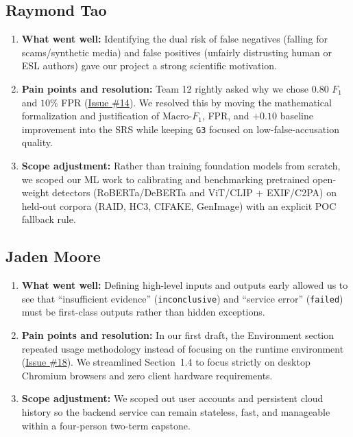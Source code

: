 \documentclass[11pt]{article}
\begin{document}
\subsection*{Raymond Tao}
\begin{enumerate}[leftmargin=*]
    \item \textbf{What went well:} Identifying the dual risk of false negatives (falling for scams/synthetic media) and false positives (unfairly distrusting human or ESL authors) gave our project a strong scientific motivation.
    \item \textbf{Pain points and resolution:} Team 12 rightly asked why we chose $0.80$ $F_1$ and $10\%$ FPR (\href{https://github.com/richy1337/Verity/issues/14}{Issue \#14}). We resolved this by moving the mathematical formalization and justification of $\text{Macro-}F_1$, FPR, and $+0.10$ baseline improvement into the SRS while keeping \texttt{G3} focused on low-false-accusation quality.
    \item \textbf{Scope adjustment:} Rather than training foundation models from scratch, we scoped our ML work to calibrating and benchmarking pretrained open-weight detectors (RoBERTa/DeBERTa and ViT/CLIP + EXIF/C2PA) on held-out corpora (RAID, HC3, CIFAKE, GenImage) with an explicit POC fallback rule.
\end{enumerate}

\subsection*{Jaden Moore}
\begin{enumerate}[leftmargin=*]
    \item \textbf{What went well:} Defining high-level inputs and outputs early allowed us to see that ``insufficient evidence'' (\texttt{inconclusive}) and ``service error'' (\texttt{failed}) must be first-class outputs rather than hidden exceptions.
    \item \textbf{Pain points and resolution:} In our first draft, the Environment section repeated usage methodology instead of focusing on the runtime environment (\href{https://github.com/richy1337/Verity/issues/18}{Issue \#18}). We streamlined Section~1.4 to focus strictly on desktop Chromium browsers and zero client hardware requirements.
    \item \textbf{Scope adjustment:} We scoped out user accounts and persistent cloud history so the backend service can remain stateless, fast, and manageable within a four-person two-term capstone.
\end{enumerate}
\end{document}
